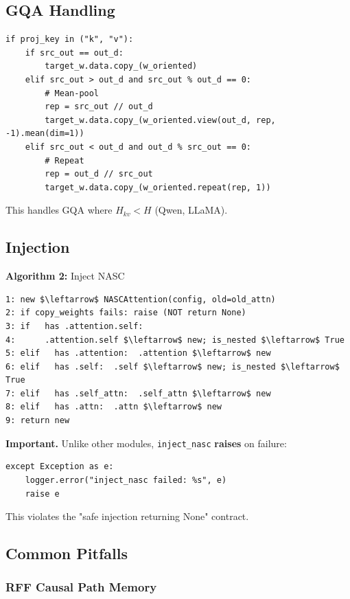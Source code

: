 \subsection{GQA Handling}

\begin{lstlisting}
if proj_key in ("k", "v"):
    if src_out == out_d:
        target_w.data.copy_(w_oriented)
    elif src_out > out_d and src_out % out_d == 0:
        # Mean-pool
        rep = src_out // out_d
        target_w.data.copy_(w_oriented.view(out_d, rep, -1).mean(dim=1))
    elif src_out < out_d and out_d % src_out == 0:
        # Repeat
        rep = out_d // src_out
        target_w.data.copy_(w_oriented.repeat(rep, 1))
\end{lstlisting}

This handles GQA where $H_{kv} < H$ (Qwen, LLaMA).

\subsection{Injection}

\textbf{Algorithm 2:} Inject NASC
\begin{lstlisting}
1: new $\leftarrow$ NASCAttention(config, old=old_attn)
2: if copy_weights fails: raise (NOT return None)
3: if   has .attention.self:
4:      .attention.self $\leftarrow$ new; is_nested $\leftarrow$ True
5: elif   has .attention:  .attention $\leftarrow$ new
6: elif   has .self:  .self $\leftarrow$ new; is_nested $\leftarrow$ True
7: elif   has .self_attn:  .self_attn $\leftarrow$ new
8: elif   has .attn:  .attn $\leftarrow$ new
9: return new
\end{lstlisting}

\textbf{Important.} Unlike other modules, \texttt{inject\_nasc} \textbf{raises} on failure:

\begin{lstlisting}
except Exception as e:
    logger.error("inject_nasc failed: %s", e)
    raise e
\end{lstlisting}

This violates the "safe injection returning None" contract.

\subsection{Common Pitfalls}

\subsubsection{RFF Causal Path Memory}

